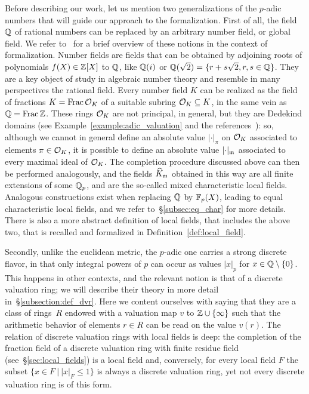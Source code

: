 \documentclass[sigplan,10pt, nonacm, review]{acmart}
\begin{document}
Before describing our work, let us mention two generalizations of the $p$-adic numbers that will guide our approach to the formalization. First of all, the field $\mathbb{Q}$ of rational numbers can be replaced by an arbitrary number field, or global field. We refer to~\cite[\S2]{BaaDahNarNuc22} for a brief overview of these notions in the context of formalization. Number fields are fields that can be obtained by adjoining roots of polynomials $f(X)\in\mathbb{Z}[X]$ to $\mathbb{Q}$, like $\mathbb{Q}(i)$ or $\mathbb{Q}(\sqrt{2})=\{r+s\sqrt{2}, r,s\in\mathbb{Q}\}$. They are a key object of study in algebraic number theory and resemble in many perspectives the rational field. Every number field $K$ can be realized as the field of fractions $K=\operatorname{Frac}{\mathcal{O}_{K}}$ of a suitable subring $\mathcal{O}_{K}\subseteq K$, in the same vein as $\mathbb{Q}=\operatorname{Frac}{\mathbb{Z}}$. These rings $\mathcal{O}_{K}$ are not principal, in general, but they are Dedekind domains (see Example~\ref{example:adic_valuation} and the references~\ibid): so, although we cannot in general define an absolute value $\lvert\cdot\rvert_\pi$ on $\mathcal{O}_{K}$ associated to elements $\pi\in\mathcal{O}_{K}$, it is possible to define an absolute value $\lvert\cdot\rvert_{\maxid[\empty]}$ associated to every maximal ideal of $\mathcal{O}_{K}$. The completion procedure discussed above can then be performed analogously, and the fields $\compl[{\maxid[\empty]}]{K}$ obtained in this way are all finite extensions of some $\mathbb{Q}_p$, and are the so-called mixed characteristic local fields. Analogous constructions exist when replacing $\mathbb{Q}$ by $\mathbb{F}_{p}(X)$, leading to equal characteristic local fields, and we refer to~\S\ref{subsec:eq_char} for more details. There is also a more abstract definition of local fields, that includes the above two, that is recalled and formalized in Definition~\ref{def:local_field}.

Secondly, unlike the euclidean metric, the $p$-adic one carries a strong discrete flavor, in that only integral powers of $p$ can occur as values $\lvert x\rvert_p$ for $x\in\mathbb{Q}\setminus\{0\}$. This happens in other contexts, and the relevant notion is that of a discrete valuation ring; we will describe their theory in more detail in~\S\ref{subsection:def_dvr}. Here we content ourselves with saying that they are a class of rings~$R$ endowed with a valuation map $v$ to $\mathbb{Z}\cup\{\infty\}$ such that the arithmetic behavior of elements $r\in R$ can be read on the value $v(r)$. The relation of discrete valuation rings with local fields is deep: the completion of the fraction field of a discrete valuation ring with finite residue field (see~\S\ref{sec:local_fields}) is a local field and, conversely, for every local field $F$ the subset $\{x \in F \:\vert\: \lvert x\rvert_F\leq 1\}$ is always a discrete valuation ring, yet not every discrete valuation ring is of this form.
\end{document}
